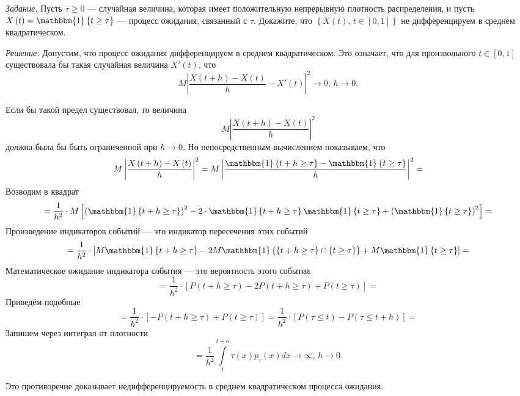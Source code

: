 \textit{Задание.}
Пусть $ \tau \geq 0$ --- случайная величина,
которая имеет положительную непрерывную плотность распределения,
и пусть $X \left( t \right) = \mathbbm{1} \left\{ t \geq \tau \right\} $ --- процесс ожидания,
связанный с $ \tau $.
Докажите, что $ \left\{ X \left( t \right), \, t \in \left[ 0, 1 \right] \right\} $
не дифференцируем в среднем квадратическом.

\textit{Решение.}
Допустим, что процесс ожидания дифференцируем в среднем квадратическом.
Это означает, что для произвольного $t \in \left[ 0, 1 \right] $
существовала бы такая случайная величина $X' \left( t \right) $, что
$$M \left| \frac{X \left( t + h \right) - X \left( t \right) }{h} - X' \left( t \right) \right|^2 \to
  0, \,
  h \to 0.$$

Если бы такой предел существовал, то величина
$$M \left| \frac{X \left( t + h \right) - X \left( t \right) }{h} \right|^2$$
должна была бы быть ограниченной при $h \to 0$.
Но непосредственным вычислением показываем, что
$$M \left| \frac{X \left( t + h \right) - X \left( t \right) }{h} \right|^2 =
  M \left|
    \frac{ \mathbbm{1} \left\{ t + h \geq \tau \right\} - \mathbbm{1} \left\{ t \geq \tau \right\} }{h}
  \right|^2 =$$
Возводим в квадрат
$$= \frac{1}{h^2} \cdot M \left[
    \left( \mathbbm{1} \left\{ t + h \geq \tau \right\} \right)^2 -
    2 \cdot \mathbbm{1} \left\{ t + h \geq \tau \right\} \mathbbm{1} \left\{ t \geq \tau \right\} +
    \left( \mathbbm{1} \left\{ t \geq \tau \right\} \right)^2
  \right] =$$
Произведение индикаторов событий --- это индикатор пересечения этих событий
$$= \frac{1}{h^2} \cdot \left[
    M \mathbbm{1} \left\{ t + h \geq \tau \right\} -
    2M \mathbbm{1} \left\{
      \left\{ t + h \geq \tau \right\} \cap \left\{ t \geq \tau \right\} \right\} +
    M \mathbbm{1} \left\{ t \geq \tau \right\} \right] =$$
Математическое ожидание индикатора события --- это вероятность этого события
$$= \frac{1}{h^2} \cdot \left[
    P \left( t + h \geq \tau \right) - 2P \left( t + h \geq \tau \right) +
    P \left( t \geq \tau \right) \right] =$$
Приведём подобные
$$= \frac{1}{h^2} \cdot
  \left[ -P \left( t + h \geq \tau \right) + P \left( t \geq \tau \right) \right] =
  \frac{1}{h^2} \cdot
  \left[ P \left( \tau \leq t \right) - P \left( \tau \leq t + h \right) \right] =$$
Запишем через интеграл от плотности
$$= \frac{1}{h^2} \int \limits_t^{t + h} \tau \left( x \right) p_{ \tau } \left( x \right) dx \to
  \infty, \,
  h \to 0.$$

Это противоречие доказывает недифференцируемость в среднем квадратическом процесса ожидания.

